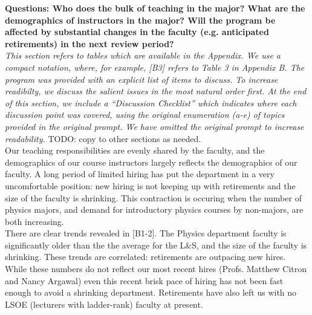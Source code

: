 \documentclass[12pt]{article}
\begin{document}
{\bf Questions: Who does the bulk of teaching in the major? What are the demographics of instructors in the major? Will the program be affected by substantial changes in the faculty (e.g. anticipated retirements) in the next review period?}\\[3pt]


\noindent
{\it This section refers to tables which are available in the Appendix.  We
use a compact notation, where, for example, [B3] refers to Table 3 in
Appendix B.  The program was provided with an explicit list of items
to discuss.  To increase readibilty, we discuss the salient issues in
the most natural order first.  At the end of this section, we include a
``Discussion Checklist'' which indicates where each discussion point
was covered, using the original enumeration (a-e) of topics provided
in the original prompt. We have omitted the original prompt to
increase readability.}  {\color{red} TODO: copy to other sections as
      needed}.\\[3pt]

\noindent
Our teaching responsibilities are evenly shared by the faculty, and
the demographics of our course instructors largely reflects the
demographics of our faculty.  A long period of limited hiring has put
the department in a very uncomfortable position: new hiring is not
keeping up with retirements and the size of the faculty is shrinking.
This contraction is occuring when the number of physics majors, and
demand for introductory physics courses by non-majors, are both
increasing.\\[3pt]

 There are clear trends
revealed in [B1-2].  The Physics department faculty is significantly
older than the the average for the L\&S, and the size of the faculty
is shrinking.  These trends are correlated: retirements are outpacing
new hires.  While these numbers do not reflect our most recent hires
(Profs. Matthew Citron and Nancy Argawal) even this recent brisk pace
of hiring has not been fast enough to avoid a shrinking department.
Retirements have also left us with no LSOE (lecturers with
ladder-rank) faculty at present.
\end{document}
